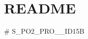 \chapter{README}
\hypertarget{md__r_e_a_d_m_e}{}\label{md__r_e_a_d_m_e}
﻿\# S\+\_\+\+PO2\+\_\+\+PRO\+\_\+\_\+ID15B 